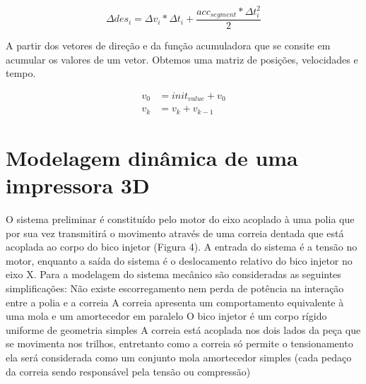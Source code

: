 \begin{equation}
    \label{eq:delta_des_interpol}
    \Delta des_i = \Delta v_i*\Delta t_i+ \frac{acc_{segment}*\Delta t_i^2}{2} 
\end{equation}

A partir dos vetores de direção e da função acumuladora que se consite em acumular os valores de um vetor.
Obtemos uma matriz de posições, velocidades e tempo.

\begin{equation}
    \label{eq:acumulator_function}
    \begin{split}
        v_{0} &= init_{value} + v_{0} \\
        v_k &= v_k+v_{k-1}
    \end{split}
\end{equation}




    






\section{Modelagem dinâmica de uma impressora 3D}

O sistema preliminar é constituído pelo motor do eixo acoplado à uma polia que por sua vez transmitirá o movimento através de uma correia dentada que está acoplada ao corpo do bico injetor (Figura 4). A entrada do sistema é a tensão no motor, enquanto a saída do sistema é o deslocamento relativo do bico injetor no eixo X.
Para a modelagem do sistema mecânico são consideradas as seguintes simplificações:
Não existe escorregamento nem perda de potência na interação entre a polia e a correia
A correia apresenta um comportamento equivalente à uma mola e um amortecedor em paralelo
O bico injetor é um corpo rígido uniforme de geometria simples
A correia está acoplada nos dois lados da peça que se movimenta nos trilhos, entretanto como a correia só permite o tensionamento ela será considerada como um conjunto mola amortecedor simples (cada pedaço da correia sendo responsável pela tensão ou compressão)

